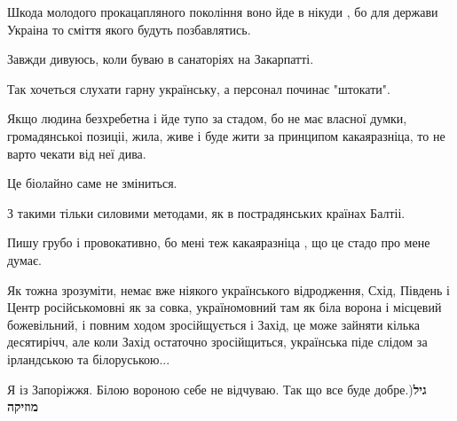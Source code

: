 \begin{itemize}
Шкода молодого прокацапляного покоління воно йде в нікуди , бо для держави
Украіна то сміття якого будуть позбавлятись.


 

Завжди дивуюсь, коли буваю в санаторіях на Закарпатті.

Так хочеться слухати гарну українську, а персонал починає "штокати".


 

Якщо людина безхребетна і йде тупо за стадом, бо не має власної думки,
громадянськоі позиціі, жила, живе і буде жити за принципом какаяразніца, то не
варто чекати від неї дива.

Це біолайно саме не зміниться.

З такими тільки силовими методами, як в пострадянських країнах Балтіі.

Пишу грубо і провокативно, бо мені теж какаяразніца , що це стадо про мене
думає.

 

Як тожна зрозуміти, немає вже ніякого українського відродження, Схід, Південь і
Центр російськомовні як за совка, україномовний там як біла ворона і місцевий
божевільний, і повним ходом зросійщується і Захід, це може зайняти кілька
десятирічч, але коли Захід остаточно зросійщиться, українська піде слідом за
ірландською та білоруською...

\begin{itemize}
 
Я із Запоріжжя.
Білою вороною себе не відчуваю.
Так що все буде добре.)\textbf{גיל מוזיקה}


\end{itemize}
\end{itemize}
